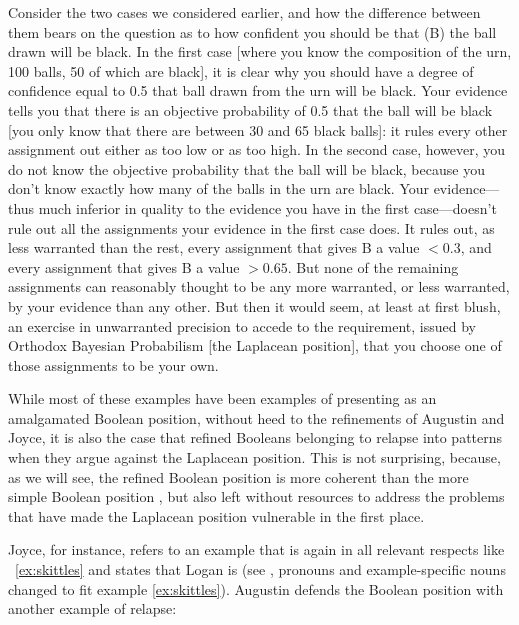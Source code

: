\documentclass[phd,12pt,oneside]{ubcthesis}
\begin{document}
\begin{quotex}
  Consider the two cases we considered earlier, and how the difference
  between them bears on the question as to how confident you should be
  that (B) the ball drawn will be black. In the first case [where you
  know the composition of the urn, 100 balls, 50 of which are black],
  it is clear why you should have a degree of confidence equal to 0.5
  that ball drawn from the urn will be black. Your evidence tells you
  that there is an objective probability of 0.5 that the ball will be
  black [you only know that there are between 30 and 65 black balls]:
  it rules every other assignment out either as too low or as too
  high. In the second case, however, you do not know the objective
  probability that the ball will be black, because you don't know
  exactly how many of the balls in the urn are black. Your
  evidence---thus much inferior in quality to the evidence you have in
  the first case---doesn't rule out all the assignments your evidence
  in the first case does. It rules out, as less warranted than the
  rest, every assignment that gives B a value $<0.3$, and every
  assignment that gives B a value $>0.65$. But none of the remaining
  assignments can reasonably thought to be any more warranted, or less
  warranted, by your evidence than any other. But then it would seem,
  at least at first blush, an exercise in unwarranted precision to
  accede to the requirement, issued by Orthodox Bayesian Probabilism
  [the Laplacean position], that you choose one of those assignments
  to be your own. 
\end{quotex}

While most of these examples have been examples of presenting
{\anderson} as an amalgamated Boolean position, without heed to the
refinements of Augustin and Joyce, it is also the case that refined
Booleans belonging to {\augustin} relapse into {\anderson} patterns
when they argue against the Laplacean position. This is not
surprising, because, as we will see, the refined Boolean position
{\augustin} is more coherent than the more simple Boolean position
{\anderson}, but also left without resources to address the problems
that have made the Laplacean position vulnerable in the first place.

Joyce, for instance, refers to an example that is again in all
relevant respects like {\xample}~\ref{ex:skittles} and states that Logan
is  (see ,
pronouns and example-specific nouns changed to fit example
\ref{ex:skittles}). Augustin defends the Boolean position with another
example of relapse:
\end{document}
